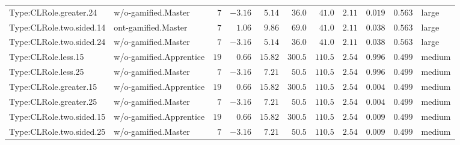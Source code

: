 \documentclass[6pt,a4paper]{article}
\begin{document}
{\begin{longtable}{llrrrrrrrrl}
Type:CLRole.greater.24&w/o-gamified.Master&$ 7$&$-3.16$&$ 5.14$&$ 36.0$&$ 41.0$&$2.11$&$0.019$&$0.563$&large\tabularnewline
Type:CLRole.two.sided.14&ont-gamified.Master&$ 7$&$ 1.06$&$ 9.86$&$ 69.0$&$ 41.0$&$2.11$&$0.038$&$0.563$&large\tabularnewline
Type:CLRole.two.sided.24&w/o-gamified.Master&$ 7$&$-3.16$&$ 5.14$&$ 36.0$&$ 41.0$&$2.11$&$0.038$&$0.563$&large\tabularnewline
Type:CLRole.less.15&w/o-gamified.Apprentice&$19$&$ 0.66$&$15.82$&$300.5$&$110.5$&$2.54$&$0.996$&$0.499$&medium\tabularnewline
Type:CLRole.less.25&w/o-gamified.Master&$ 7$&$-3.16$&$ 7.21$&$ 50.5$&$110.5$&$2.54$&$0.996$&$0.499$&medium\tabularnewline
Type:CLRole.greater.15&w/o-gamified.Apprentice&$19$&$ 0.66$&$15.82$&$300.5$&$110.5$&$2.54$&$0.004$&$0.499$&medium\tabularnewline
Type:CLRole.greater.25&w/o-gamified.Master&$ 7$&$-3.16$&$ 7.21$&$ 50.5$&$110.5$&$2.54$&$0.004$&$0.499$&medium\tabularnewline
\newpage
Type:CLRole.two.sided.15&w/o-gamified.Apprentice&$19$&$ 0.66$&$15.82$&$300.5$&$110.5$&$2.54$&$0.009$&$0.499$&medium\tabularnewline
Type:CLRole.two.sided.25&w/o-gamified.Master&$ 7$&$-3.16$&$ 7.21$&$ 50.5$&$110.5$&$2.54$&$0.009$&$0.499$&medium\tabularnewline
\hline
\end{longtable}}
\end{document}
